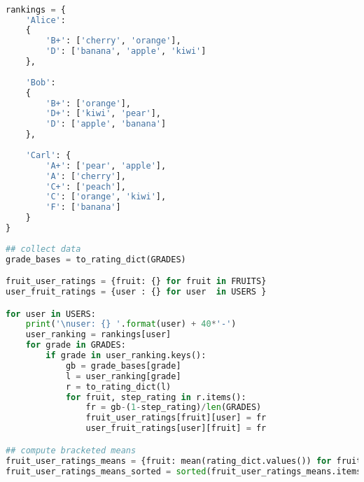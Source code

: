 \begin{lstlisting}[language=Python]

rankings = {
    'Alice': 
    {
        'B+': ['cherry', 'orange'], 
        'D': ['banana', 'apple', 'kiwi']
    },
    
    'Bob': 
    {
        'B+': ['orange'], 
        'D+': ['kiwi', 'pear'], 
        'D': ['apple', 'banana']
    },
    
    'Carl': {
        'A+': ['pear', 'apple'], 
        'A': ['cherry'], 
        'C+': ['peach'], 
        'C': ['orange', 'kiwi'], 
        'F': ['banana']
    }
}
    
## collect data
grade_bases = to_rating_dict(GRADES)

fruit_user_ratings = {fruit: {} for fruit in FRUITS}
user_fruit_ratings = {user : {} for user  in USERS }

for user in USERS:
    print('\nuser: {} '.format(user) + 40*'-')
    user_ranking = rankings[user]
    for grade in GRADES:
        if grade in user_ranking.keys():
            gb = grade_bases[grade]
            l = user_ranking[grade]
            r = to_rating_dict(l)
            for fruit, step_rating in r.items():
                fr = gb-(1-step_rating)/len(GRADES)
                fruit_user_ratings[fruit][user] = fr
                user_fruit_ratings[user][fruit] = fr

## compute bracketed means
fruit_user_ratings_means = {fruit: mean(rating_dict.values()) for fruit, rating_dict in fruit_user_ratings.items()}
fruit_user_ratings_means_sorted = sorted(fruit_user_ratings_means.items(), key=operator.itemgetter(1))

\end{lstlisting}

{\color{red}{
TODO: make the above code prettier
}}
